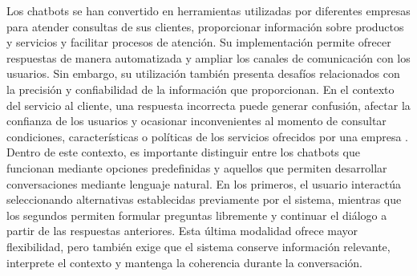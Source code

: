 \documentclass[manuscrito,spanish]{rcc}
\begin{document}
Los chatbots se han convertido en herramientas utilizadas por diferentes empresas para atender consultas de sus clientes, proporcionar información sobre productos y servicios y facilitar procesos de atención. Su implementación permite ofrecer respuestas de manera automatizada y ampliar los canales de comunicación con los usuarios. Sin embargo, su utilización también presenta desafíos relacionados con la precisión y confiabilidad de la información que proporcionan. En el contexto del servicio al cliente, una respuesta incorrecta puede generar confusión, afectar la confianza de los usuarios y ocasionar inconvenientes al momento de consultar condiciones, características o políticas de los servicios ofrecidos por una empresa \citep{larsen2025}.
Dentro de este contexto, es importante distinguir entre los chatbots que funcionan mediante opciones predefinidas y aquellos que permiten desarrollar conversaciones mediante lenguaje natural. En los primeros, el usuario interactúa seleccionando alternativas establecidas previamente por el sistema, mientras que los segundos permiten formular preguntas libremente y continuar el diálogo a partir de las respuestas anteriores. Esta última modalidad ofrece mayor flexibilidad, pero también exige que el sistema conserve información relevante, interprete el contexto y mantenga la coherencia durante la conversación.
\end{document}
